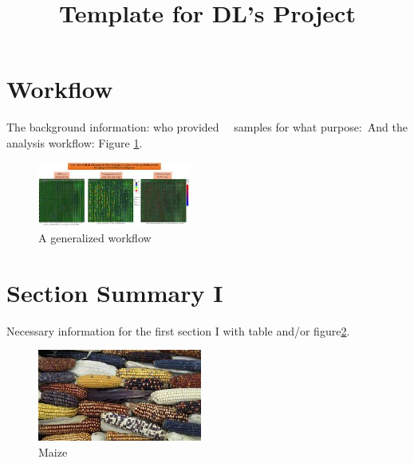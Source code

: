 \documentclass[9pt,twocolumn]{report}
\title{Template for DL's Project}
\author{\clientfont \Client}
\affil{\sffamily\bfseries\LARGE Report Date: \dashdate\today}
\affil{\intfont  \Inst | E-mail: \Email}
\begin{document}
\maketitle
\thispagestyle{firststyle}
\logomark
\firstpagefootnote
\vspace{-20pt}
\vspace{-11pt}

\section{Workflow}
The background information: who \Client provided   \SampleNumber\ \Species\ samples for what purpose:\ \ProjectPurpose\.
And the analysis workflow: Figure \ref{workflow}. \par

\begin{figure}[ht]
\centering
\includegraphics[width=0.45\textwidth]{drone.jpeg}
\caption{A generalized workflow}
\label{workflow}
\end{figure} 


 

\section{Section Summary I}
Necessary information for the first section I with table and/or figure\ref{NGS:SectI}.\\

\begin{figure}[!ht]
\centering
\scriptsize
    \includegraphics[width=0.48\textwidth]{maize.jpeg}
\caption{Maize}
\label{NGS:SectI}
\end{figure}
\end{document}
